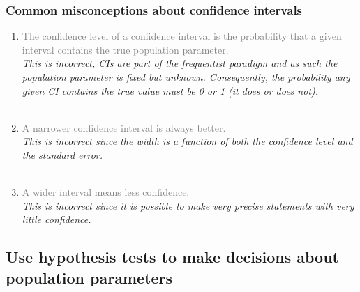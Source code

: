 \documentclass[11pt,containsverbatim,handout,xcolor=xelatex,dvipsnames,table]{beamer}
\begin{document}

\begin{frame}
\frametitle{Common misconceptions about confidence intervals}

\begin{enumerate}

\item \textcolor{gray}{The confidence level of a confidence interval is the probability that a given interval contains the true population parameter.} \\
\textit{This is incorrect, CIs are part of the frequentist paradigm and as such the population parameter is fixed but unknown. Consequently, the probability any given CI contains the true value must be 0 or 1 (it does or does not).} \\
$\:$ \\

\pause

\item  \textcolor{gray}{A narrower confidence interval is always better.}\\
\textit{This is incorrect since the width is a function of both the confidence level and the standard error.} \\
$\:$ \\

\pause

\item   \textcolor{gray}{A wider interval means less confidence.} \\
\textit{This is incorrect since it is possible to make very precise statements with very little confidence.} \\

\end{enumerate}

\end{frame}


\subsection{Use hypothesis tests to make decisions about population parameters}
\label{mi4}


\begin{frame}

\vfill


\vfill

\end{frame}
\end{document}
